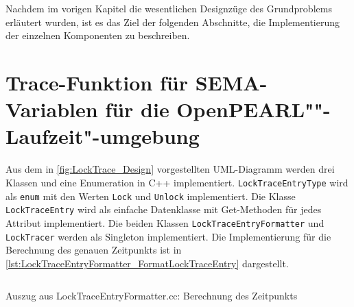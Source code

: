Nachdem im vorigen Kapitel die wesentlichen Designzüge des Grundproblems
erläutert wurden, ist es das Ziel der folgenden Abschnitte, die Implementierung
der einzelnen Komponenten zu beschreiben. 

\section{Trace-Funktion für \textrm{SEMA}-Variablen für die OpenPEARL""-Laufzeit"-umgebung}
\label{section:Implementierung:Trace-Funktion}
Aus dem in \cref{fig:LockTrace_Design} vorgestellten UML-Diagramm werden drei
Klassen und eine Enumeration in C++ implementiert.
\texttt{Lock\-Trace\-Entry\-Type} wird als \texttt{enum} mit den Werten
\texttt{Lock} und \texttt{Unlock} implementiert. Die Klasse
\texttt{Lock\-Trace\-Entry} wird als einfache Datenklasse mit Get-Methoden für
jedes Attribut implementiert. Die beiden Klassen
\texttt{Lock\-Trace\-Entry\-Formatter} und \texttt{Lock\-Tracer} werden als
Singleton implementiert. Die Implementierung für die Berechnung des genauen
Zeitpunkts ist in \cref{lst:LockTraceEntryFormatter_FormatLockTraceEntry}
dargestellt.
\begin{listing}[ht]
  \inputminted[frame=lines,linenos,firstline=31,lastline=33]{cpp}{./cpp/LockTraceEntryFormatter.cc}
  \caption{Auszug aus LockTraceEntryFormatter.cc: Berechnung des Zeitpunkts}
  \label{lst:LockTraceEntryFormatter_FormatLockTraceEntry}   
\end{listing}

